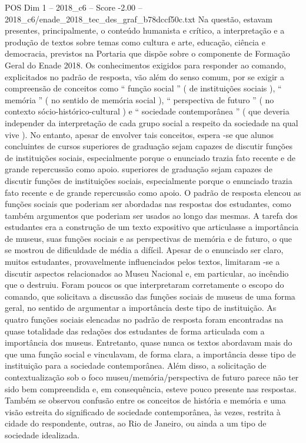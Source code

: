 \begin{textsample}{POS Dim 1 – 2018\_c6 – Score -2.00 – 2018\_c6/enade\_2018\_tec\_des\_graf\_b78dccf50c.txt}
Na questão, estavam presentes, principalmente, o conteúdo humanista e crítico, a interpretação e a produção de textos sobre temas como cultura e arte, educação, ciência e democracia, previstos na Portaria que dispõe sobre o componente de Formação Geral do Enade 2018.
Os conhecimentos exigidos para responder ao comando, explicitados no padrão de resposta, vão além do senso comum, por se exigir a compreensão de conceitos como “ função social ” ( de instituições sociais ), “ memória ” ( no sentido de memória social ), “ perspectiva de futuro ” ( no contexto sócio-histórico-cultural ) e “ sociedade contemporânea ” ( que deveria independer da interpretação de cada grupo social a respeito da sociedade na qual vive ).
No entanto, apesar de envolver tais conceitos, espera -se que alunos concluintes de cursos superiores de graduação sejam capazes de discutir funções de instituições sociais, especialmente porque o enunciado trazia fato recente e de grande repercussão como apoio. superiores de graduação sejam capazes de discutir funções de instituições sociais, especialmente porque o enunciado trazia fato recente e de grande repercussão como apoio.
O padrão de resposta elencou as funções sociais que poderiam ser abordadas nas respostas dos estudantes, como também argumentos que poderiam ser usados ao longo das mesmas.
A tarefa dos estudantes era a construção de um texto expositivo que articulasse a importância de museus, suas funções sociais e as perspectivas de memória e de futuro, o que se mostrou de dificuldade de média a difícil.
Apesar de o enunciado ser claro, muitos estudantes, provavelmente influenciados pelos textos, limitaram -se a discutir aspectos relacionados ao Museu Nacional e, em particular, ao incêndio que o destruiu.
Foram poucos os que interpretaram corretamente o escopo do comando, que solicitava a discussão das funções sociais de museus de uma forma geral, no sentido de argumentar a importância deste tipo de instituição.
As quatro funções sociais elencadas no padrão de resposta foram encontradas na quase totalidade das redações dos estudantes de forma articulada com a importância dos museus.
Entretanto, quase nunca os textos abordavam mais do que uma função social e vinculavam, de forma clara, a importância desse tipo de instituição para a sociedade contemporânea.
Além disso, a solicitação de contextualização sob o foco museu/memória/perspectiva de futuro parece não ter sido bem compreendida e, em consequência, esteve pouco presente nas respostas.
Também se observou confusão entre os conceitos de história e memória e uma visão estreita do significado de sociedade contemporânea, às vezes, restrita à cidade do respondente, outras, ao Rio de Janeiro, ou ainda a um tipo de sociedade idealizada.

\end{textsample}
